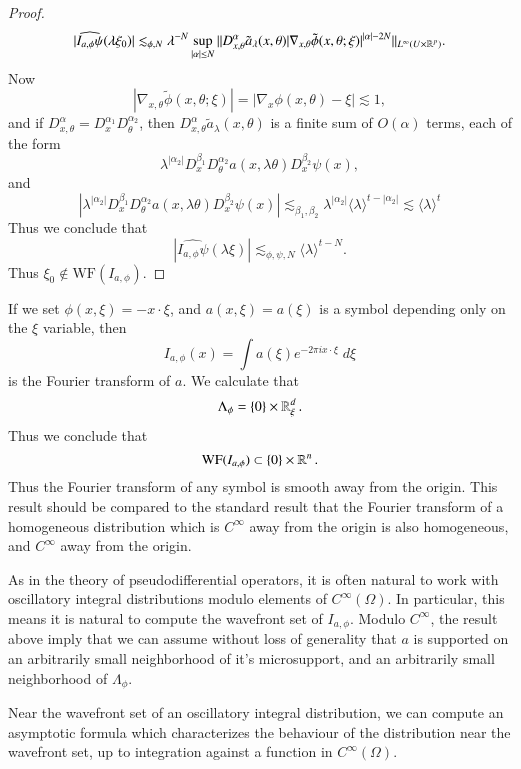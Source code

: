 \begin{proof}
    \[ |\widehat{I_{a,\phi} \psi}(\lambda \xi_0)| \lesssim_{\phi,N} \lambda^{-N} \sup_{|\alpha| \leq N} \| D^\alpha_{x,\theta} \tilde{a}_\lambda(x,\theta) |\nabla_{x,\theta} \tilde{\phi}(x,\theta;\xi)|^{|\alpha| - 2N} \|_{L^\infty(U \times \operatorname{\mathbb{R}}^p)}. \]
    Now
    \[ |\nabla_{x,\theta} \tilde{\phi}(x,\theta;\xi)| = |\nabla_x \phi(x,\theta) - \xi| \lesssim 1, \]
    and if $D^\alpha_{x,\theta} = D^{\alpha_1}_x D^{\alpha_2}_\theta$, then $D^\alpha_{x,\theta} \tilde{a}_\lambda(x,\theta)$ is a finite sum of $O(\alpha)$ terms, each of the form
    \[ \lambda^{|\alpha_2|} D^{\beta_1}_x D^{\alpha_2}_\theta a(x,\lambda \theta) D^{\beta_2}_x \psi(x), \]
    and
    \[ |\lambda^{|\alpha_2|} D^{\beta_1}_x D^{\alpha_2}_\theta a(x,\lambda \theta) D^{\beta_2}_x \psi(x)| \lesssim_{\beta_1,\beta_2} \lambda^{|\alpha_2|} \langle \lambda \rangle^{t - |\alpha_2|} \lesssim \langle \lambda \rangle^t \]
    Thus we conclude that
    \[ |\widehat{I_{a,\phi} \psi}(\lambda \xi)| \lesssim_{\phi,\psi,N} \langle \lambda \rangle^{t - N}. \]
    Thus $\xi_0 \not \in \text{WF}(I_{a,\phi})$.
\end{proof}

\begin{example}
    If we set $\phi(x,\xi) = - x \cdot \xi$, and $a(x,\xi) = a(\xi)$ is a symbol depending only on the $\xi$ variable, then
    \[ I_{a,\phi}(x) = \int a(\xi) e^{- 2 \pi i x \cdot \xi}\; d\xi \]
    is the Fourier transform of $a$. We calculate that
    \[ \Lambda_\phi = \{ 0 \} \times \operatorname{\mathbb{R}}^d_\xi. \]
    Thus we conclude that
    \[ \text{WF}(I_{a,\phi}) \subset \{ 0 \} \times \operatorname{\mathbb{R}}^n. \]
    Thus the Fourier transform of any symbol is smooth away from the origin. This result should be compared to the standard result that the Fourier transform of a homogeneous distribution which is $C^\infty$ away from the origin is also homogeneous, and $C^\infty$ away from the origin.
\end{example}

As in the theory of pseudodifferential operators, it is often natural to work with oscillatory integral distributions modulo elements of $C^\infty(\Omega)$. In particular, this means it is natural to compute the wavefront set of $I_{a,\phi}$. Modulo $C^\infty$, the result above imply that we can assume without loss of generality that $a$ is supported on an arbitrarily small neighborhood of it's microsupport, and an arbitrarily small neighborhood of $\Lambda_\phi$.

Near the wavefront set of an oscillatory integral distribution, we can compute an asymptotic formula which characterizes the behaviour of the distribution near the wavefront set, up to integration against a function in $C^\infty(\Omega)$.

